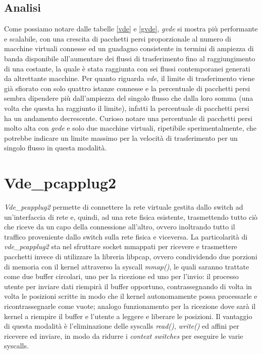 \subsection{Analisi}
Come possiamo notare dalle tabelle {\ref{vde}} e {\ref{gvde}}, {\em gvde} si mostra più performante e scalabile, con una crescita di pacchetti persi proporzionale al numero di macchine virtuali connesse ed un guadagno consistente in termini di ampiezza di banda disponibile all'aumentare dei flussi di trasferimento fino al raggiungimento di una costante, la quale è stata raggiunta con sei flussi contemporanei generati da altrettante macchine. Per quanto riguarda {\em vde}, il limite di trasferimento viene già sfiorato con solo quattro istanze connesse e la percentuale di pacchetti persi sembra dipendere più dall'ampiezza del singolo flusso che dalla loro somma (una volta che questa ha raggiunto il limite), infatti la percentuale di pacchetti persi ha un andamento decrescente. Curioso notare una percentuale di pacchetti persi molto alta con {\em gvde} e solo due macchine virtuali, ripetibile sperimentalmente, che potrebbe indicare un limite massimo per la velocità di trasferimento per un singolo flusso in questa modalità.
\section{Vde\_pcapplug2}
{\em Vde\_pcapplug2} permette di connettere la rete virtuale gestita dallo switch ad un'interfaccia di rete e, quindi, ad una rete fisica esistente, trasmettendo tutto ciò che riceve da un capo della connessione all'altro, ovvero inoltrando tutto il traffico proveniente dallo switch sulla rete fisica e viceversa.
La particolarità di {\em vde\_pcapplug2} sta nel sfruttare socket mmappati per ricevere e trasmettere pacchetti invece di utilizzare la libreria libpcap, ovvero condividendo due porzioni di memoria con il kernel attraverso la syscall {\em mmap()}, le quali saranno trattate come due buffer circolari, uno per la ricezione ed uno per l'invio: il processo utente per inviare dati riempirà il buffer opportuno, contrassegnando di volta in volta le posizioni scritte in modo che il kernel autonomamente possa processarle e ricontrassegnarle come vuote; analogo funzionamento per la ricezione dove sarà il kernel a riempire il buffer e l'utente a leggere e liberare le posizioni. Il vantaggio di questa modalità è l'eliminazione delle syscalls {\em read()}, {\em write()} ed affini per ricevere ed inviare, in modo da ridurre i {\em context switches} per eseguire le varie syscalls.
